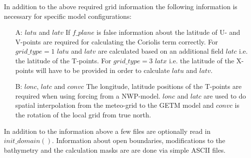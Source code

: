  In addition to the above required grid information the following
  information is necessary for specific model configurations:
  \begin{itemize}
      \item[A:] $latu$ and $latv$ \newline
             If $f\_plane$ is false information about the
             latitude of U- and V-points are required for calculating
             the Coriolis term correctly. For $grid\_type=1$
             $latu$ and $latv$ are calculated based on an additional field
             $latc$ i.e. the latitude of the T-points. For $grid\_type=3$
             $latx$ i.e. the latitude of the X-points will have to be
             provided in order to calculate $latu$ and $latv$.
      \item[B:] $lonc$, $latc$ and $convc$ \newline
             The longitude, latitude positions of
             the T-points are required when using forcing from a NWP-model.
             $lonc$ and $latc$ are used to do spatial interpolation from
             the meteo-grid to the GETM model and $convc$ is the rotation
             of the local grid from true north.
  \end{itemize}

  In addition to the information above a few files are optionally read
  in $init\_domain()$. Information about open boundaries, modifications
  to the bathymetry and the calculation masks are are done via simple
  ASCII files. \newline

\vspace{0.5cm}




